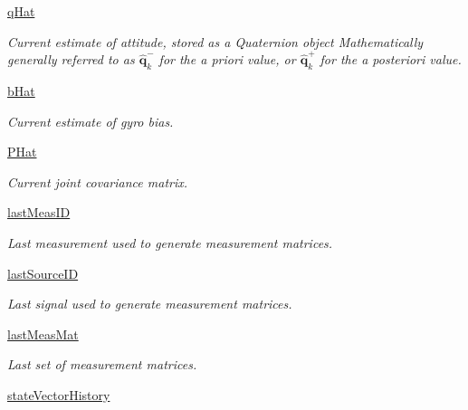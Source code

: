 \begin{DoxyCompactItemize}
\item 
\hyperlink{classmodest_1_1substates_1_1attitude_1_1Attitude_a22a550534d908153baef2e52f7142c5e}{q\+Hat}
\begin{DoxyCompactList}\small\item\em Current estimate of attitude, stored as a Quaternion object Mathematically generally referred to as $\mathbf{\hat{q}}^{-}_{k}$ for the a priori value, or $\mathbf{\hat{q}}^{+}_{k}$ for the a posteriori value. \end{DoxyCompactList}\item 
\hyperlink{classmodest_1_1substates_1_1attitude_1_1Attitude_aac0bc92dc53893d2f190c1252690053c}{b\+Hat}
\begin{DoxyCompactList}\small\item\em Current estimate of gyro bias. \end{DoxyCompactList}\item 
\hyperlink{classmodest_1_1substates_1_1attitude_1_1Attitude_a2f79616ca660e0cc1e628adf94738249}{P\+Hat}
\begin{DoxyCompactList}\small\item\em Current joint covariance matrix. \end{DoxyCompactList}\item 
\hyperlink{classmodest_1_1substates_1_1attitude_1_1Attitude_abc1a273c6fd65c839184ae644b68f010}{last\+Meas\+ID}
\begin{DoxyCompactList}\small\item\em Last measurement used to generate measurement matrices. \end{DoxyCompactList}\item 
\hyperlink{classmodest_1_1substates_1_1attitude_1_1Attitude_a0ec5bf8475ca5c175e4a516d2ac68fdf}{last\+Source\+ID}
\begin{DoxyCompactList}\small\item\em Last signal used to generate measurement matrices. \end{DoxyCompactList}\item 
\hyperlink{classmodest_1_1substates_1_1attitude_1_1Attitude_add344f4323848f4ccdd9e59d699310a0}{last\+Meas\+Mat}
\begin{DoxyCompactList}\small\item\em Last set of measurement matrices. \end{DoxyCompactList}\item 
\hyperlink{classmodest_1_1substates_1_1substate_1_1SubState_a38c12c9d0899bc1161f3502b584517a2}{state\+Vector\+History}

\end{DoxyCompactItemize}
